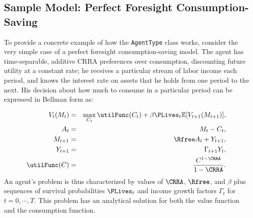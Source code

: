 \documentclass[12pt,titlepage,letterpaper]{econtex}
\providecommand{\E}{\mathbb{E}}
\begin{document}
{%


\subsection{Sample Model: Perfect Foresight Consumption-Saving}\label{sec:PerfectForesight}

To provide a concrete example of how the \texttt{AgentType} class works, consider the very simple case of a perfect foresight consumption-saving model.  The agent has time-separable, additive CRRA preferences over consumption, discounting future utility at a constant rate; he receives a particular stream of labor income each period, and knows the interest rate on assets that he holds from one period to the next.  His decision about how much to consume in a particular period can be expressed in Bellman form as:

\begin{eqnarray*}
V_t(M_t) &=& \max_{C_t} \utilFunc(C_t) + \beta \PLives_t \E [V_{t+1}(M_{t+1}) ], \\
A_t &=& M_t - C_t, \\
M_{t+1} &=& \Rfree A_t + Y_{t+1}, \\
Y_{t+1} &=& \Gamma_{t+1} Y_t, \\
\utilFunc(C) &=& \frac{C^{1-\CRRA}}{1-\CRRA}.
\end{eqnarray*}
An agent's problem is thus characterized by values of $\CRRA$, $\Rfree$,  and $\beta$ plus sequences of survival probabilities $\PLives_t$ and income growth factors $\Gamma_t$ for $t=0,\cdots,T$.  This problem has an analytical solution for both the value function and the consumption function.

}
\end{document}
